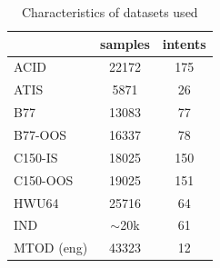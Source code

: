 \begin{table}[tp]
\centering
\footnotesize{
\setlength\tabcolsep{2pt}
\begin{tabular}{l|cc}
\toprule
                                                 &    samples    & intents    \\%
\midrule%
ACID \cite{acharya2020using}                    & 22172         & 175               \\%
ATIS \cite{hemphill1990atis}                    & 5871          & 26                \\%
B77 \cite{casanueva2020efficient}               & 13083         & 77                \\%
B77-OOS                                         & 16337         & 78                \\
C150-IS \cite{larson-etal-2019-evaluation}      & 18025         & 150               \\%
C150-OOS  \cite{larson-etal-2019-evaluation}    & 19025         & 151               \\
HWU64 \cite{liu2021benchmarking}                & 25716         & 64                \\%
IND                                             & $\sim$20k     & 61                \\%
MTOD (eng) \cite{schuster2019cross}               & 43323         & 12                \\%
\bottomrule
\end{tabular}
}
\caption{Characteristics of datasets used}
\label{tab:datasets}
\end{table}